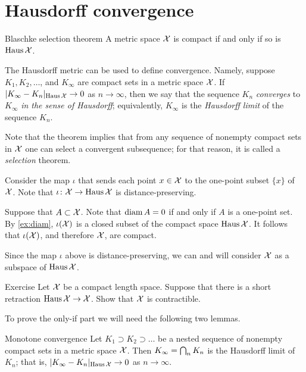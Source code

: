 \section{Hausdorff convergence}

\begin{thm}{Blaschke selection theorem}\label{thm:compact+Hausdorff}
A metric space $\mathcal{X}$ is compact if and only if
so is $\operatorname{\rm Haus}\nolimits\mathcal{X}$.
\end{thm}

The Hausdorff metric can be used to define convergence.
Namely, suppose $K_1,K_2,\dots$, and $K_\infty$ are compact sets in a metric space $\mathcal{X}$.
If $|K_\infty-K_n|_{\operatorname{\rm Haus}\nolimits\mathcal{X}}\to0$ as $n\to\infty$, then we say that 
the sequence $K_n$ {}\emph{converges} to $K_\infty$ \emph{in the sense of Hausdorff};
equivalently, $K_\infty$ is the \emph{Hausdorff limit} of the sequence $K_n$.

Note that the theorem implies that from any sequence of nonempty compact sets in $\mathcal{X}$ one can select a convergent subsequence; 
for that reason, it is called a \textit{selection} theorem. 

Consider the map $\iota$ that sends each point $x\in \mathcal{X}$ to the one-point subset $\{x\}$ of $\mathcal{X}$.
Note that $\iota\colon\mathcal{X}\to \operatorname{\rm Haus}\nolimits\mathcal{X}$ is distance-preserving.

Suppose that $A\subset \mathcal{X}$.
Note that $\operatorname{\rm diam}\nolimits A=0$ if and only if $A$ is a one-point set.
By \ref{ex:diam}, $\iota(\mathcal{X})$ is a closed subset of the compact space $\operatorname{\rm Haus}\nolimits\mathcal{X}$.
It follows that $\iota(\mathcal{X})$, and therefore $\mathcal{X}$, are compact.
\qeds

Since the map $\iota$ above is distance-preserving, we can and will consider $\mathcal{X}$ as a subspace of $\operatorname{\rm Haus}\nolimits\mathcal{X}$.

\begin{thm}{Exercise}\label{ex:haus-contractible}
Let $\mathcal{X}$ be a compact length space.
Suppose that there is a short retraction $\operatorname{\rm Haus}\nolimits\mathcal{X}\to \mathcal{X}$.
Show that $\mathcal{X}$ is contractible.
\end{thm}


To prove the only-if part we will need the following two lemmas.

\begin{thm}{Monotone convergence}\label{lem:decreasing-converges}
Let $K_1\supset K_2\supset\dots$ be a nested sequence of nonempty compact sets in a metric space $\mathcal{X}$.
Then $K_\infty\z=\bigcap_n K_n$ is the Hausdorff limit of $K_n$;
that is, $|K_\infty-K_n|_{\operatorname{\rm Haus}\nolimits\mathcal{X}}\to0$ as $n\to\infty$.
\end{thm}

